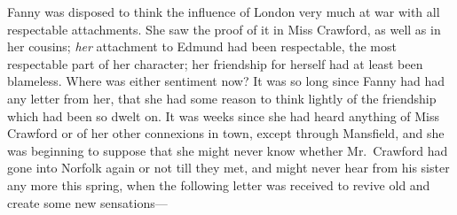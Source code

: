 Fanny was disposed to think the influence of London
very much at war with all respectable attachments.
She saw the proof of it in Miss Crawford, as well as in
her cousins; \emph{her} attachment to Edmund had been respectable,
the most respectable part of her character; her friendship
for herself had at least been blameless.  Where was
either sentiment now?  It was so long since Fanny had had
any letter from her, that she had some reason to think
lightly of the friendship which had been so dwelt on.
It was weeks since she had heard anything of Miss Crawford
or of her other connexions in town, except through Mansfield,
and she was beginning to suppose that she might never
know whether Mr.\ Crawford had gone into Norfolk again
or not till they met, and might never hear from his
sister any more this spring, when the following letter
was received to revive old and create some new sensations---%

